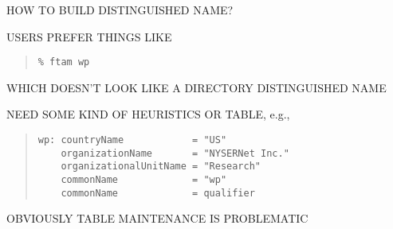 \begin{bwslide}

\begin{nrtc}
\item	HOW TO BUILD DISTINGUISHED NAME?

\item	USERS PREFER THINGS LIKE
\begin{quote}\small\begin{verbatim}
% ftam wp
\end{verbatim}\end{quote}

\item	WHICH DOESN'T LOOK LIKE A DIRECTORY DISTINGUISHED NAME
\end{nrtc}
\end{bwslide}


\begin{bwslide}

\begin{nrtc}
\item	NEED SOME KIND OF HEURISTICS OR TABLE, e.g.,
\begin{quote}\small\begin{verbatim}
wp: countryName            = "US"
    organizationName       = "NYSERNet Inc."
    organizationalUnitName = "Research"
    commonName             = "wp"
    commonName             = qualifier
\end{verbatim}\end{quote}

\item	OBVIOUSLY TABLE MAINTENANCE IS PROBLEMATIC
\end{nrtc}
\end{bwslide}


